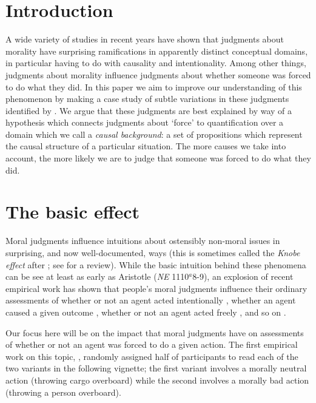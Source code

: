 \documentclass{salt}
\begin{document}
\section{Introduction}

A wide variety of studies in recent years have shown that judgments about morality have surprising ramifications in apparently distinct conceptual domains, in particular having to do with causality and intentionality. Among other things, judgments about morality influence judgments about whether someone was forced to do what they did. In this paper we aim to improve our understanding of this phenomenon by making a case study of subtle variations in these judgments identified by \citet{young2011paradox}. We argue that these judgments are best explained by way of a hypothesis which connects judgments about `force' to quantification over a domain which we call a \emph{causal background}: a set of propositions which represent the causal structure of a particular situation. The more causes we take into account, the more likely we are to judge that someone was forced to do what they did.


\section{The basic effect}

Moral judgments influence intuitions about ostensibly non-moral issues in surprising, and now well-documented, ways (this is sometimes called the \emph{Knobe effect} after \citealt{knobe2003intentional}; see \citeyear{knobe2010person} for a review). While the basic intuition behind these phenomena can be see at least as early as Aristotle (\textit{NE} 1110$^a$8-9), an explosion of recent empirical work has shown that people's moral judgments influence their ordinary assessments of whether or not an agent acted intentionally \citep{knobe2003intentional,leslie2006acting,cova2015intentional}, whether an agent caused a given outcome \citep{alicke1992culpable,knobe2008causal, hitchcock2009cause}, whether or not an agent acted freely \citep{phillips2009moral}, and so on \citep{pettit2009pervasive,phillips2015unifying}.

Our focus here will be on the impact that moral judgments have on assessments of whether or not an agent was forced to do a given action. The first empirical work on this topic, \citealt{phillips2009moral}, randomly assigned half of participants to read each of the two variants in the following vignette; the first variant involves a morally neutral action (throwing cargo overboard) while the second involves a morally bad action (throwing a person overboard).
\end{document}

